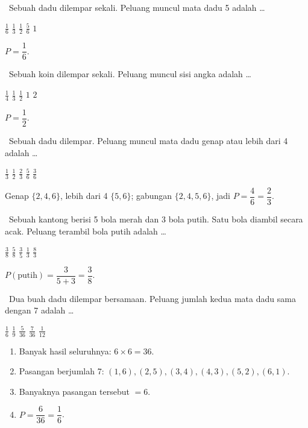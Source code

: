 \documentclass[11pt,a4paper]{exam}
\newenvironment{langkah}{%
  \begin{enumerate}[label=\textbf{Langkah \arabic*:},leftmargin=2.6em,
    itemsep=2pt,topsep=2pt]}{\end{enumerate}}
\newcommand{\Fund}{{\footnotesize\textsf{\textcolor{hijau}{[Fundamental]}}}\ }
\newcommand{\Inter}{{\footnotesize\textsf{\textcolor{biru}{[Intermediate]}}}\ }
\newcommand{\Adv}{{\footnotesize\textsf{\textcolor{oranye}{[Advanced]}}}\ }
\newcommand{\topik}[1]{%
  \par\addvspace{14pt}%
  \noindent{\large\bfseries\color{biru}#1}\par\addvspace{6pt}}
\begin{document}
\begin{questions}
\topik{8. Peluang (5 Soal)}

\question \Fund Sebuah dadu dilempar sekali. Peluang muncul mata dadu 5 adalah \dots
\begin{choices}
\CorrectChoice $\tfrac{1}{6}$ \choice $\tfrac{1}{3}$ \choice $\tfrac{1}{2}$ \choice $\tfrac{5}{6}$ \choice $1$
\end{choices}
\begin{solution}$P = \dfrac{1}{6}.$\end{solution}

\question \Fund Sebuah koin dilempar sekali. Peluang muncul sisi angka adalah \dots
\begin{choices}
\choice $\tfrac{1}{4}$ \choice $\tfrac{1}{3}$ \CorrectChoice $\tfrac{1}{2}$ \choice $1$ \choice $2$
\end{choices}
\begin{solution}$P = \dfrac{1}{2}.$\end{solution}

\question \Inter Sebuah dadu dilempar. Peluang muncul mata dadu genap atau lebih
dari 4 adalah \dots
\begin{choices}
\choice $\tfrac{1}{3}$ \choice $\tfrac{1}{2}$ \CorrectChoice $\tfrac{2}{3}$ \choice $\tfrac{5}{6}$ \choice $\tfrac{3}{6}$
\end{choices}
\begin{solution}Genap $\{2,4,6\}$, lebih dari 4 $\{5,6\}$; gabungan $\{2,4,5,6\}$,
jadi $P = \dfrac{4}{6} = \dfrac{2}{3}.$\end{solution}

\question \Inter Sebuah kantong berisi 5 bola merah dan 3 bola putih. Satu bola
diambil secara acak. Peluang terambil bola putih adalah \dots
\begin{choices}
\CorrectChoice $\tfrac{3}{8}$ \choice $\tfrac{5}{8}$ \choice $\tfrac{3}{5}$ \choice $\tfrac{1}{3}$ \choice $\tfrac{8}{3}$
\end{choices}
\begin{solution}$P(\text{putih}) = \dfrac{3}{5+3} = \dfrac{3}{8}.$\end{solution}

\question \Adv Dua buah dadu dilempar bersamaan. Peluang jumlah kedua mata dadu
sama dengan 7 adalah \dots
\begin{choices}
\CorrectChoice $\tfrac{1}{6}$ \choice $\tfrac{1}{9}$ \choice $\tfrac{5}{36}$ \choice $\tfrac{7}{36}$ \choice $\tfrac{1}{12}$
\end{choices}
\begin{solution}
\begin{langkah}
\item Banyak hasil seluruhnya: $6 \times 6 = 36$.
\item Pasangan berjumlah 7: $(1,6),(2,5),(3,4),(4,3),(5,2),(6,1)$.
\item Banyaknya pasangan tersebut $= 6$.
\item $P = \dfrac{6}{36} = \dfrac{1}{6}$.
\end{langkah}
\end{solution}

\end{questions}
\end{document}
